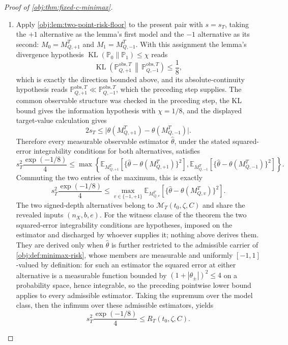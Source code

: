 \begin{proof}[Proof of \cref{obj:thm:fixed-c-minimax}]
\begin{enumerate}
\item Apply \cref{obj:lem:two-point-risk-floor} to the present pair with \(s=s_T\), taking the \(+1\) alternative as the lemma's first model and the \(-1\) alternative as its second: \(M_0=M_{Q,+1}^T\) and \(M_1=M_{Q,-1}^T\). With this assignment the lemma's divergence hypothesis \(\operatorname{KL}(\mathbb P_0\|\mathbb P_1)\le\chi\) reads
\[
\operatorname{KL}\!\left(
\mathbb P_{Q,+1}^{\mathrm{obs},T}
\,\middle\|\,
\mathbb P_{Q,-1}^{\mathrm{obs},T}
\right)
\le
\frac18 ,
\]
which is exactly the direction bounded above, and its absolute-continuity hypothesis reads \(\mathbb P_{Q,+1}^{\mathrm{obs},T}\ll\mathbb P_{Q,-1}^{\mathrm{obs},T}\), which the preceding step supplies. The common observable structure was checked in the preceding step, the KL bound gives the information hypothesis with \(\chi=1/8\), and the displayed target-value calculation gives
\[
2s_T
\le
\bigl|\theta(M_{Q,+1}^T)-\theta(M_{Q,-1}^T)\bigr|.
\]
Therefore every measurable observable estimator \(\widehat\theta\), under the stated squared-error integrability conditions for both alternatives, satisfies
\[
s_T^2\frac{\exp(-1/8)}{4}
\le
\max\left\{
\mathbb E_{M_{Q,+1}^T}\!\left[
\{\widehat\theta-\theta(M_{Q,+1}^T)\}^2
\right],
\mathbb E_{M_{Q,-1}^T}\!\left[
\{\widehat\theta-\theta(M_{Q,-1}^T)\}^2
\right]
\right\}.
\]
Commuting the two entries of the maximum, this is exactly
\[
s_T^2\frac{\exp(-1/8)}{4}
\le
\max_{v\in\{-1,+1\}}
\mathbb E_{M_{Q,v}^T}\!\left[
\{\widehat\theta-\theta(M_{Q,v}^T)\}^2
\right].
\]
The two signed-depth alternatives belong to \(\mathcal M_T(t_0,\zeta,C)\) and share the revealed inputs \((n_X,b,e)\). For the witness clause of the theorem the two squared-error integrability conditions are hypotheses, imposed on the estimator and discharged by whoever supplies it; nothing above derives them. They are derived only when \(\widehat\theta\) is further restricted to the admissible carrier of \cref{obj:def:minimax-risk}, whose members are measurable and uniformly \([-1,1]\)-valued by definition: for such an estimator the squared error at either alternative is a measurable function bounded by \((1+|\theta_\pm|)^2\le4\) on a probability space, hence integrable, so the preceding pointwise lower bound applies to every admissible estimator. Taking the supremum over the model class, then the infimum over these admissible estimators, yields
\[
s_T^2\frac{\exp(-1/8)}{4}
\le
R_T(t_0,\zeta,C).
\] %


\end{enumerate}
\end{proof}

